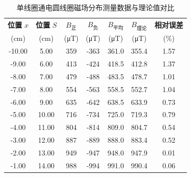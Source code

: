\documentclass{../template/Report}%
\begin{document}
\begin{fullreportonly}
    \begin{table}[H]
        \centering
        \caption{单线圈通电圆线圈磁场分布测量数据与理论值对比}
        \label{tab:single_coil}
        \small
        \begin{tabular}{c c c c c c c}
            \toprule
            \textbf{位置} $x$ & \textbf{位置} $S$ & $B_{\text{正}}$      & $B_{\text{负}}$      & $B_{\text{平均}}$     & $B_{\text{理论}}$     & \textbf{相对误差} \\
            (\si{cm})       & (\si{cm})       & (\si{\micro\tesla}) & (\si{\micro\tesla}) & (\si{\micro\tesla}) & (\si{\micro\tesla}) & (\%)          \\
            \midrule
            -10.00          & 5.00            & 359                 & -363                & 361.0               & 355.4               & 1.57          \\
            -9.00           & 6.00            & 413                 & -424                & 418.5               & 412.8               & 1.37          \\
            -8.00           & 7.00            & 479                 & -488                & 483.5               & 478.7               & 1.01          \\
            -7.00           & 8.00            & 554                 & -563                & 558.5               & 552.7               & 1.04          \\
            -6.00           & 9.00            & 635                 & -642                & 638.5               & 633.9               & 0.73          \\
            -5.00           & 10.00           & 716                 & -734                & 725.0               & 719.3               & 0.79          \\
            -4.00           & 11.00           & 804                 & -814                & 809.0               & 804.7               & 0.54          \\
            -3.00           & 12.00           & 887                 & -889                & 888.0               & 883.4               & 0.52          \\
            -2.00           & 13.00           & 949                 & -947                & 948.0               & 947.9               & 0.01          \\
            -1.00           & 14.00           & 988                 & -994                & 991.0               & 990.4               & 0.06          \\

\end{tabular}
\end{table}
\end{fullreportonly}
\end{document}
